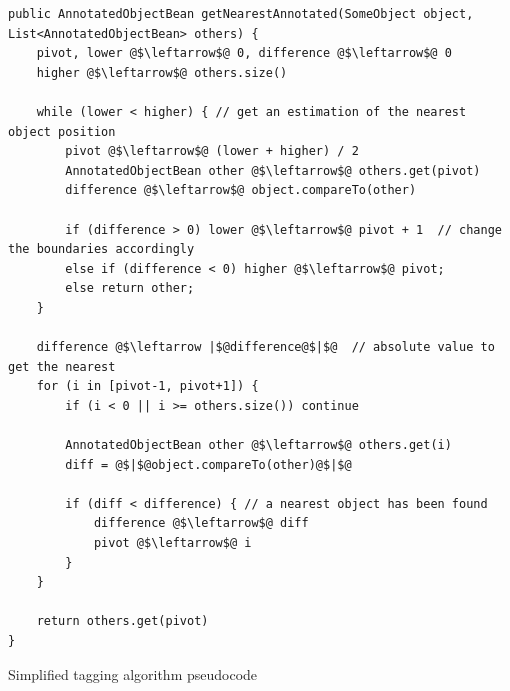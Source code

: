 \begin{listing}
	\begin{verbatim}
public AnnotatedObjectBean getNearestAnnotated(SomeObject object, List<AnnotatedObjectBean> others) {
	pivot, lower @$\leftarrow$@ 0, difference @$\leftarrow$@ 0
	higher @$\leftarrow$@ others.size()
	
	while (lower < higher) { // get an estimation of the nearest object position 
		pivot @$\leftarrow$@ (lower + higher) / 2
		AnnotatedObjectBean other @$\leftarrow$@ others.get(pivot)
		difference @$\leftarrow$@ object.compareTo(other)
		
		if (difference > 0) lower @$\leftarrow$@ pivot + 1  // change the boundaries accordingly 
		else if (difference < 0) higher @$\leftarrow$@ pivot;
		else return other;
	}
	
	difference @$\leftarrow |$@difference@$|$@  // absolute value to get the nearest
	for (i in [pivot-1, pivot+1]) {
		if (i < 0 || i >= others.size()) continue
		
		AnnotatedObjectBean other @$\leftarrow$@ others.get(i)
		diff = @$|$@object.compareTo(other)@$|$@
		
		if (diff < difference) { // a nearest object has been found
			difference @$\leftarrow$@ diff
			pivot @$\leftarrow$@ i
		}
	}
	
	return others.get(pivot)	
}
	\end{verbatim}
	\caption{Simplified tagging algorithm pseudocode}
	\label{lst:simplified tagging algorithm}
\end{listing}









